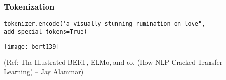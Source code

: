 \begin{frame}[fragile]\frametitle{ Tokenization}

\lstinline|tokenizer.encode("a visually stunning rumination on love", add_special_tokens=True)|


			\begin{center}
			\texttt{[image: bert139]}
			\end{center}	

{\tiny (Ref: The Illustrated BERT, ELMo, and co. (How NLP Cracked Transfer Learning) – Jay Alammar)}

\end{frame}

